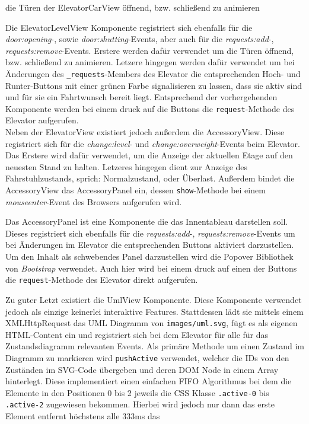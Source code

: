 die Türen der ElevatorCarView öffnend, bzw. schließend zu animieren

Die ElevatorLevelView Komponente registriert sich ebenfalls für die \textit{door:opening}-, sowie \textit{door:shutting}-Events, aber auch für die \textit{requests:add}-, \textit{requests:remove}-Events.
Erstere werden dafür verwendet um die Türen öffnend, bzw. schließend zu animieren.
Letzere hingegen werden dafür verwendet um bei Änderungen des \texttt{\_requests}-Members des Elevator die entsprechenden Hoch- und Runter-Buttons mit einer grünen Farbe signalisieren zu lassen, dass sie aktiv sind und für sie ein Fahrtwunsch bereit liegt.
Entsprechend der vorhergehenden Komponente werden bei einem druck auf die Buttons die \texttt{request}-Methode des Elevator aufgerufen. \\

Neben der ElevatorView existiert jedoch außerdem die AccessoryView.
Diese registriert sich für die \textit{change:level}- und \textit{change:overweight}-Events beim Elevator.
Das Erstere wird dafür verwendet, um die Anzeige der aktuellen Etage auf den neuesten Stand zu halten.
Letzeres hingegen dient zur Anzeige des Fahrstuhlzustands, sprich: Normalzustand, oder Überlast.
Außerdem bindet die AccessoryView das AccessoryPanel ein, dessen \texttt{show}-Methode bei einem \textit{mouseenter}-Event des Browsers aufgerufen wird.

Das AccessoryPanel ist eine Komponente die das Innentableau darstellen soll.
Dieses registriert sich ebenfalls für die \textit{requests:add}-, \textit{requests:remove}-Events um bei Änderungen im Elevator die entsprechenden Buttons aktiviert darzustellen.
Um den Inhalt als schwebendes Panel darzustellen wird die Popover Bibliothek von \textit{Bootstrap} verwendet.
Auch hier wird bei einem druck auf einen der Buttons die \texttt{request}-Methode des Elevator direkt aufgerufen.

Zu gu­ter Letzt existiert die UmlView Komponente.
Diese Komponente verwendet jedoch als einzige keinerlei interaktive Features.
Stattdessen lädt sie mittels einem XMLHttpRequest das UML Diagramm von \texttt{images/uml.svg}, fügt es als eigenen HTML-Content ein und registriert sich bei dem Elevator für alle für das Zustandsdiagramm relevanten Events.
Als primäre Methode um einen Zustand im Diagramm zu markieren wird \texttt{pushActive} verwendet, welcher die IDs von den Zuständen im SVG-Code übergeben und deren DOM Node in einem Array hinterlegt.
Diese implementiert einen einfachen FIFO Algorithmus bei dem die Elemente in den Positionen 0 bis 2 jeweils die CSS Klasse \texttt{.active-0} bis \texttt{.active-2} zugewiesen bekommen.
Hierbei wird jedoch nur dann das erste Element entfernt höchstens alle 333ms das

